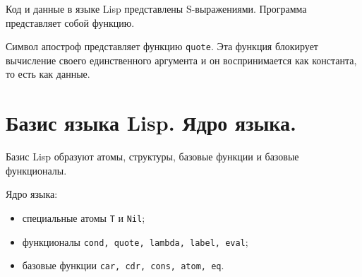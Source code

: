         Код и данные в языке Lisp представлены S-выражениями. Программа представляет собой функцию.
        
        Символ апостроф представляет функцию \texttt{quote}. Эта функция блокирует вычисление своего единственного аргумента и он воспринимается как константа, то есть как данные.

    \section*{Базис языка Lisp. Ядро языка.}

        Базис Lisp образуют атомы, структуры, базовые функции и базовые функционалы.
        
        Ядро языка:
        \begin{itemize}
            \item специальные атомы \texttt{T} и  \texttt{Nil};
            \item функционалы \texttt{cond, quote, lambda, label, eval};
            \item базовые функции \texttt{car, cdr, cons, atom, eq}.
        \end{itemize}

